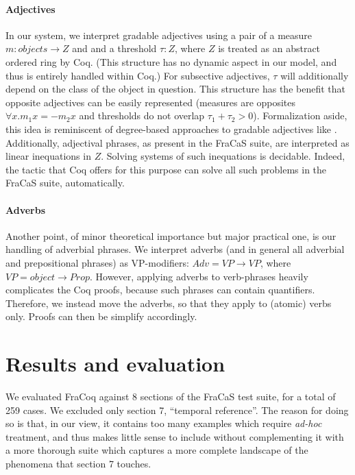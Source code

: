 \documentclass{article}
\begin{document}
\paragraph{Adjectives}
In our system, we interpret gradable adjectives using a pair of a
measure $m : objects → Z$ and and a threshold $τ : Z$, where $Z$ is
treated as an abstract ordered ring by Coq. (This structure has no
dynamic aspect in our model, and thus is entirely handled within Coq.)
For subsective adjectives, $τ$ will additionally depend on the class
of the object in question. This structure has the benefit that
opposite adjectives can be easily represented (measures are opposites
$∀x. m_1 x = -m_2 x$ and thresholds do not overlap $τ_1 + τ_2 > 0$). Formalization aside, this idea is reminiscent of degree-based approaches to gradable adjectives like \citet{Cresswell:1976,Heim:1985,Kennedy:2007}.   Additionally,
adjectival phrases, as present in the FraCaS suite, are interpreted as
linear inequations in $Z$. Solving systems of such inequations is
decidable. Indeed, the tactic that Coq offers for this purpose can
solve all such problems in the FraCaS suite, automatically.


\paragraph{Adverbs}
Another point, of minor theoretical importance but major practical
one, is our handling of adverbial phrases. We interpret adverbs (and
in general all adverbial and prepositional phrases) as VP-modifiers:
$Adv = VP → VP$, where $VP = object → Prop$. However, applying adverbs
to verb-phrases heavily complicates the Coq proofs, because such
phrases can contain quantifiers. Therefore, we instead move the
adverbs, so that they apply to (atomic) verbs only. Proofs can then be
simplify accordingly. 



\section{Results and evaluation}

We evaluated FraCoq against 8 sections of the FraCaS test suite, for a
total of 259 cases. We excluded only section 7, ``temporal reference''. The reason for
doing so is that, in our view, it contains too many examples which
require \textit{ad-hoc} treatment, and thus makes little sense to
include without complementing it with a more thorough suite which
captures a more complete landscape of the phenomena that section 7
touches.
\end{document}
